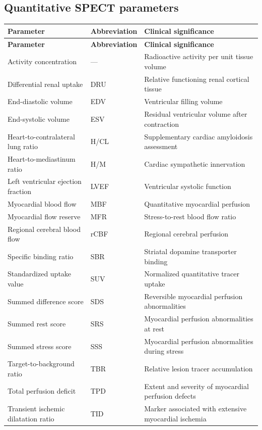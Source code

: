 \subsection{Quantitative SPECT parameters}
\begin{longtable}{@{}p{}p{}p{}@{}}
\toprule
\textbf{Parameter} & \textbf{Abbreviation} & \textbf{Clinical significance} \\
\midrule
\endfirsthead
\toprule
\textbf{Parameter} & \textbf{Abbreviation} & \textbf{Clinical significance} \\
\midrule
\endhead
Activity concentration & --- & Radioactive activity per unit tissue volume \\
Differential renal uptake & DRU & Relative functioning renal cortical tissue \\
End-diastolic volume & EDV & Ventricular filling volume \\
End-systolic volume & ESV & Residual ventricular volume after contraction \\
Heart-to-contralateral lung ratio & H/CL & Supplementary cardiac amyloidosis assessment \\
Heart-to-mediastinum ratio & H/M & Cardiac sympathetic innervation \\
Left ventricular ejection fraction & LVEF & Ventricular systolic function \\
Myocardial blood flow & MBF & Quantitative myocardial perfusion \\
Myocardial flow reserve & MFR & Stress-to-rest blood flow ratio \\
Regional cerebral blood flow & rCBF & Regional cerebral perfusion \\
Specific binding ratio & SBR & Striatal dopamine transporter binding \\
Standardized uptake value & SUV & Normalized quantitative tracer uptake \\
Summed difference score & SDS & Reversible myocardial perfusion abnormalities \\
Summed rest score & SRS & Myocardial perfusion abnormalities at rest \\
Summed stress score & SSS & Myocardial perfusion abnormalities during stress \\
Target-to-background ratio & TBR & Relative lesion tracer accumulation \\
Total perfusion deficit & TPD & Extent and severity of myocardial perfusion defects \\
Transient ischemic dilatation ratio & TID & Marker associated with extensive myocardial ischemia \\
\bottomrule
\end{longtable}

